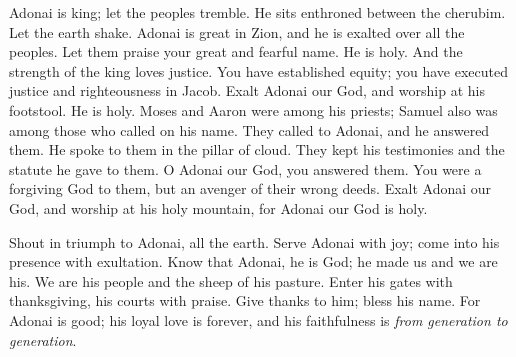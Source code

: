 \begin{biblechapter} %
 Adonai is king; let the peoples tremble. 
He sits enthroned between the cherubim. Let the earth shake.
\verse Adonai is great in Zion, 
and he is exalted over all the peoples.
\verse Let them praise your great and fearful name. 
He is holy.
\verse And the strength of the king loves justice. 
You have established equity; 
you have executed justice and righteousness in Jacob.
\verse Exalt Adonai our God, 
and worship at his footstool. 
He is holy.
\verse Moses and Aaron were among his priests; 
Samuel also was among those who called on his name. 
They called to Adonai, and he answered them.
\verse He spoke to them in the pillar of cloud. 
They kept his testimonies and the statute he gave to them.
\verse O Adonai our God, you answered them. 
You were a forgiving God to them, 
but an avenger of their wrong deeds.
\verse Exalt Adonai our God, 
and worship at his holy mountain, 
for Adonai our God is holy.
\end{biblechapter}

\begin{biblechapter} %
 Shout in triumph to Adonai, all the earth.
\verse Serve Adonai with joy; 
come into his presence with exultation.
\verse Know that Adonai, he is God; 
he made us and we are his. 
We are his people and the sheep of his pasture.
\verse Enter his gates with thanksgiving, 
his courts with praise. 
Give thanks to him; bless his name.
\verse For Adonai is good; his loyal love is forever, 
and his faithfulness is \textit{from generation to generation}.
\end{biblechapter}

